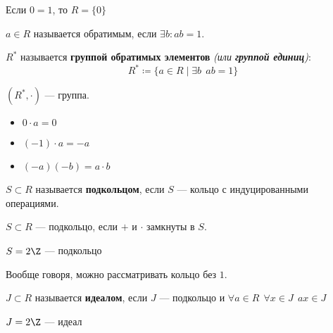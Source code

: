 \begin{remark}
    Если \(0 = 1\), то \(R = \{0\}\)
\end{remark}

\begin{definition}
    \(a \in R\) называется обратимым, если \(\exists b : ab = 1\).
\end{definition}

\begin{definition}
    \(R^*\) называется \textbf{группой обратимых элементов} \textit{(или \textbf{группой единиц})}:
    \[R^* \coloneqq \{a \in R \mid \exists b \ \ ab = 1\}\]
\end{definition}

\begin{theorem}
    \((R^*, \cdot)\) --- группа.
\end{theorem}

\begin{remark}\itemfix
    \begin{itemize}
        \item \(0 \cdot a = 0\)
        \item \(( - 1) \cdot a = - a\)
        \item \(( - a)( - b) = a \cdot b\)
    \end{itemize}
\end{remark}

\begin{definition}
    \(S \subset R\) называется \textbf{подкольцом}, если \(S\) --- кольцо с индуцированными операциями.
\end{definition}

\begin{remark}
    \(S \subset R\) --- подкольцо, если \( +\) и \( \cdot \) замкнуты в \(S\).
\end{remark}

\begin{example}
    \(S = 2\Z\) --- подкольцо
\end{example}

Вообще говоря, можно рассматривать кольцо без \(1\).

\begin{definition}
    \(J \subset R\) называется \textbf{идеалом}, если \(J\) --- подкольцо и \(\forall a \in R \ \ \forall x \in J \ \ ax \in J\)
\end{definition}

\begin{example}
    \(J = 2\Z\) --- идеал
\end{example}

